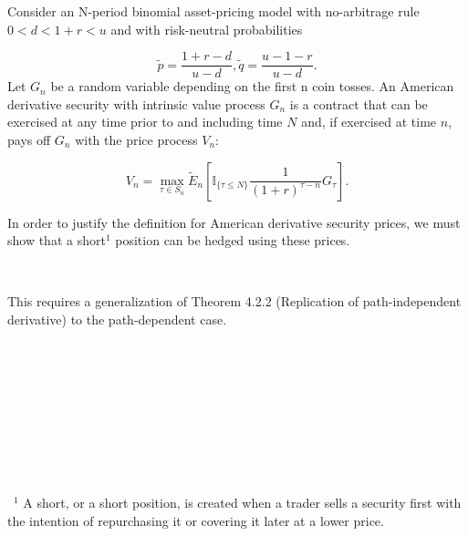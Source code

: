 \documentclass[c, dvipsnames, 8pt]{beamer}
\begin{document}
	
\begin{frame}[shrink=5]

\frametitle{\insertsection} 
\framesubtitle{\insertsubsection} 

Consider an N-period binomial asset-pricing model with no-arbitrage rule $0 < d < 1 + r < u$ and with risk-neutral probabilities

\begin{equation}\label{key}
\tilde{p}= \dfrac{1+r-d}{u-d}, \tilde{q}= \dfrac{u-1-r}{u-d}.
\end{equation}
Let $G_n$ be a random variable depending on the first n coin tosses. An American derivative security with intrinsic value process $G_n$ is a contract that can be exercised at any time prior to and including time $N$ and, if exercised at time $n$, pays off $G_n$ with the price process $V_n$:

\begin{equation}\label{eq1}
V_n = \max_{\tau \in S_n} \tilde{E}_n [\mathbb{I}_{\{\tau \leq N\}} \dfrac{1}{(1+r)^{\tau-n}}G_{\tau}].
\end{equation}

In order to justify the definition for American derivative security prices,
we must show that a short$^{1}$ position can be hedged using these prices. 

\

This requires a generalization of Theorem 4.2.2 (Replication of path-independent derivative) to the path-dependent case.

\

\

\


\

\

\
\footnotesize{$^{1}$ A short, or a short position, is created when a trader sells a security first with the intention of repurchasing it or covering it later at a lower price. } 

\end{frame}
\end{document}
